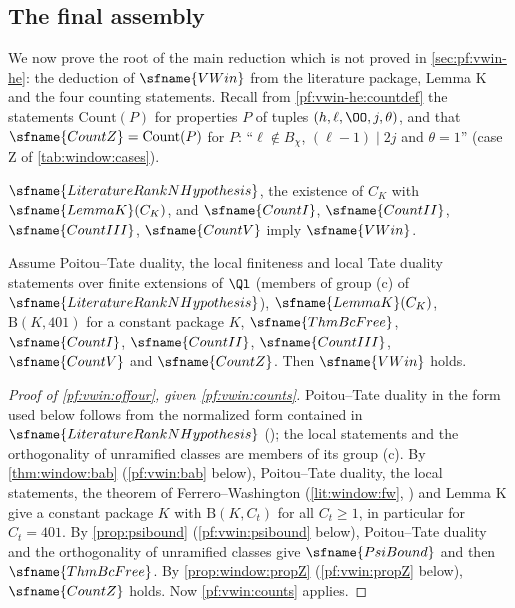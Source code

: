\subsection{The final assembly}\label{sec:pf:vwin:assembly}

We now prove the root of the main reduction which is not proved in \cref{sec:pf:vwin-he}: the deduction of
$\sfname{VWin}$ from the literature package, Lemma K and the four counting statements. Recall from
\cref{pf:vwin-he:countdef} the statements $\mathrm{Count}(P)$ for properties $P$ of tuples $(h,\ell,\OO,j,\theta)$, and
that $\sfname{CountZ}=\mathrm{Count}(P)$ for $P$: ``$\ell\notin B_\chi$, $(\ell-1)\mid2j$ and $\theta=1$'' (case Z of
\cref{tab:window:cases}).

\begin{theorem}\label{pf:vwin:offour}
$\sfname{LiteratureRankNHypothesis}$, the existence of $C_K$ with $\sfname{LemmaK}(C_K)$, and $\sfname{CountI}$,
$\sfname{CountII}$, $\sfname{CountIII}$, $\sfname{CountV}$ imply $\sfname{VWin}$.
\end{theorem}

\begin{theorem}\label{pf:vwin:counts}
Assume Poitou--Tate duality, the local finiteness and local Tate duality statements over finite extensions of $\Ql$
(members of group (c) of $\sfname{LiteratureRankNHypothesis}$), $\sfname{LemmaK}(C_K)$, $\mathrm{B}(K,401)$ for a
constant package $K$, $\sfname{ThmBcFree}$, $\sfname{CountI}$, $\sfname{CountII}$, $\sfname{CountIII}$,
$\sfname{CountV}$ and $\sfname{CountZ}$. Then $\sfname{VWin}$ holds.
\end{theorem}

\begin{proof}[Proof of \cref{pf:vwin:offour}, given \cref{pf:vwin:counts}]
Poitou--Tate duality in the form used below follows from the normalized form contained in
$\sfname{LiteratureRankNHypothesis}$ (); the local statements and the orthogonality of
unramified classes are members of its group (c). By \cref{thm:window:bab} (\cref{pf:vwin:bab} below), Poitou--Tate
duality, the local statements, the theorem of Ferrero--Washington (\cref{lit:window:fw},
) and Lemma K give a constant package $K$ with $\mathrm{B}(K,C_t)$ for
all $C_t\ge1$, in particular for $C_t=401$. By \cref{prop:psibound} (\cref{pf:vwin:psibound} below),
Poitou--Tate duality and the orthogonality of unramified classes give $\sfname{PsiBound}$ and then
$\sfname{ThmBcFree}$. By \cref{prop:window:propZ} (\cref{pf:vwin:propZ} below), $\sfname{CountZ}$ holds. Now
\cref{pf:vwin:counts} applies.
\end{proof}

